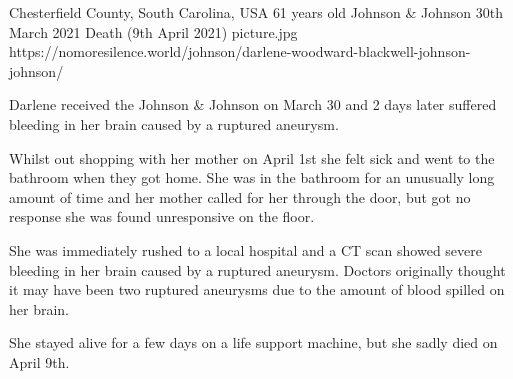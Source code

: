{Chesterfield County, South Carolina, USA}
{61 years old}
{Johnson \& Johnson }
{30th March 2021}
{Death (9th April 2021)}
{picture.jpg}
{https://nomoresilence.world/johnson/darlene-woodward-blackwell-johnson-johnson/}
{

Darlene received the Johnson \& Johnson on March 30 and 2 days later suffered
bleeding in her brain caused by a ruptured aneurysm.

Whilst out shopping with her mother on April 1st she felt sick and went to the
bathroom when they got home. She was in the bathroom for an unusually long
amount of time and her mother called for her through the door, but got no
response she was found unresponsive on the floor.

She was immediately rushed to a local hospital and a CT scan showed severe
bleeding in her brain caused by a ruptured aneurysm. Doctors originally thought
it may have been two ruptured aneurysms due to the amount of blood spilled on
her brain.

She stayed alive for a few days on a life support machine, but she sadly died on
April 9th.

}
